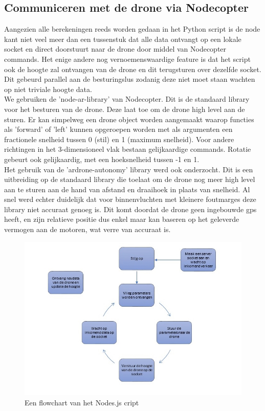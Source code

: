 \subsection{Communiceren met de drone via Nodecopter}


Aangezien alle berekeningen reeds worden gedaan in het Python script is de node kant niet veel meer dan een tussenstuk dat alle data ontvangt op een lokale socket en direct doorstuurt naar de drone door middel van Nodecopter commands. Het enige andere nog vernoemenswaardige feature is dat het script ook de hoogte zal ontvangen van de drone en dit terugsturen over dezelfde socket. Dit gebeurd parallel aan de besturingslus zodanig deze niet moet staan wachten op niet triviale hoogte data.\\

We gebruiken de 'node-ar-library' van Nodecopter. Dit is de standaard library voor het besturen van de drone. Deze laat toe om de drone high level aan de sturen. Er kan simpelweg een drone object worden aangemaakt waarop functies als 'forward' of 'left' kunnen opgeroepen worden met als argumenten een fractionele snelheid tussen 0 (stil) en 1 (maximum snelheid). Voor andere richtingen in het 3-dimensioneel vlak bestaan gelijkaardige commands. Rotatie gebeurt ook gelijkaardig, met een hoeksnelheid tussen -1 en 1.\\

Het gebruik van de 'ardrone-autonomy' library werd ook onderzocht. Dit is een uitbreiding op de standaard library die toelaat om de drone nog meer high level aan te sturen aan de hand van afstand en draaihoek in plaats van snelheid. Al snel werd echter duidelijk dat voor binnenvluchten met kleinere foutmarges deze library niet accuraat genoeg is. Dit komt doordat de drone geen ingebouwde gps heeft, en zijn relatieve positie dus enkel maar kan baseren op het geleverde vermogen aan de motoren, wat verre van accuraat is.



\begin{figure}[h]
\caption{Een flowchart van het Nodes.js cript}
\centering
\includegraphics[width=\textwidth]{images/node_server_flowchart}
\end{figure}

